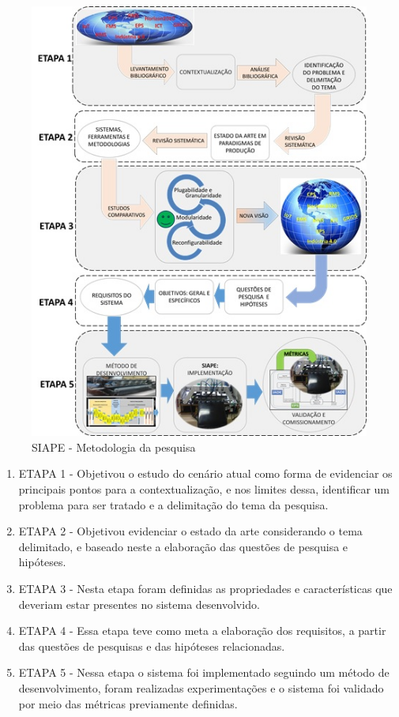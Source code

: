 \begin{figure}[h]
	\centering
	\includegraphics[height=0.8\textheight]{img/F4_SIAPE_METODOLOGIA_V0.jpg} 
	\caption{SIAPE - Metodologia da pesquisa}
	\label{fig:metodologia}
\end{figure}

\begin{enumerate}
	
	\item ETAPA 1 - Objetivou o estudo do cenário atual como forma de evidenciar os principais pontos para a contextualização, e nos limites dessa, identificar um problema para ser tratado e a delimitação do tema da pesquisa.
	
	\item ETAPA 2 - Objetivou evidenciar o estado da arte considerando o tema delimitado, e baseado neste a elaboração das questões de pesquisa e hipóteses.
	
	\item ETAPA 3 - Nesta etapa foram definidas as propriedades e características que deveriam estar presentes no sistema desenvolvido.
		
	\item ETAPA 4 - Essa etapa teve como meta a elaboração dos requisitos, a partir das questões de pesquisas e das hipóteses relacionadas.
			
	\item ETAPA 5 - Nessa etapa o sistema foi implementado seguindo um método de desenvolvimento,  foram realizadas experimentações e o sistema foi validado por meio das métricas previamente definidas.
	
\end{enumerate}	
	
